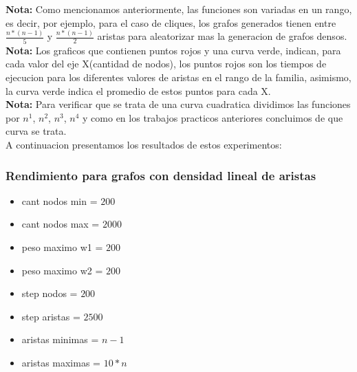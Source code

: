 \textbf{Nota: } Como mencionamos anteriormente, las funciones son variadas en un rango, es decir, por ejemplo, para el caso de cliques, los grafos generados tienen entre $\frac{n*(n-1)}{5}$ y $\frac{n*(n-1)}{2}$ aristas para aleatorizar mas la generacion de grafos densos.\\

\textbf{Nota: } Los graficos que contienen puntos rojos y una curva verde, indican, para cada valor del eje X(cantidad de nodos), los puntos rojos son los tiempos de ejecucion para los diferentes valores de aristas en el rango de la familia, asimismo, la curva verde indica el promedio de estos puntos para cada X. \\
\textbf{Nota: }Para verificar que se trata de una curva cuadratica dividimos las funciones por $n^1$, $n^2$, $n^3$, $n^4$ y como en los trabajos practicos anteriores concluimos de que curva se trata.\\

A continuacion presentamos los resultados de estos experimentos:\\
\subsubsection{Rendimiento para grafos con densidad lineal de aristas}
\begin{itemize}
	\item cant nodos min = $200$
	\item cant nodos max = $2000$
	\item peso maximo w1 = $200$
	\item peso maximo w2 = $200$
	\item step nodos = $200$
	\item step aristas = $2500$
	\item aristas minimas = $n-1$
	\item aristas maximas = $10*n$
\end{itemize}								

